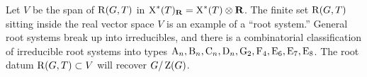 Let $V$ be the span of $\operatorname{R}(G,T)$ in 
$\operatorname{X}^\ast(T)_{\mathbf{R}}=\operatorname{X}^\ast(T)\otimes\mathbf{R}$. The finite set 
$\operatorname{R}(G,T)$ sitting inside the real vector space $V$ is an example of a 
``root system.'' General root systems break up into irreducibles, and there is 
a combinatorial classification of irreducible root systems into 
types 
$\mathrm{A}_n,\mathrm{B}_n,\mathrm{C}_n,\mathrm{D}_n,\mathrm{G}_2,\mathrm{F}_4,\mathrm{E}_6,\mathrm{E}_7,\mathrm{E}_8$. 
The root datum $\operatorname{R}(G,T)\subset V$ will recover $G/\operatorname{Z}(G)$. 





